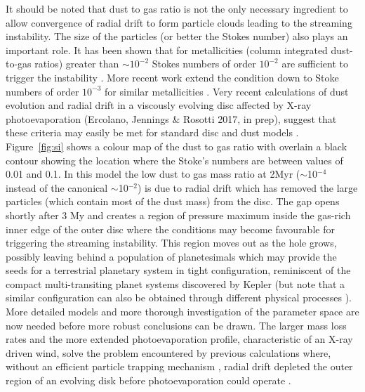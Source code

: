 \documentclass{rsos}
\begin{document}
It should be noted that dust to gas ratio is not the only necessary ingredient to allow  convergence of radial drift to form particle clouds leading to the streaming instability. The size of the particles (or better the Stokes number) also plays an important role. It has been shown that for metallicities (column integrated dust-to-gas ratios) greater than $\sim 10^{-2}$ Stokes numbers of order $10^{-2}$ are sufficient to trigger the instability  \cite{2014A&A...572A..78D}. More recent work  extend the condition down to Stoke numbers of order $10^{-3}$ for similar metallicities \cite{2015A&A...579A..43C}. 
Very recent calculations of dust evolution and radial drift in a viscously evolving disc affected by X-ray photoevaporation (Ercolano, Jennings \& Rosotti 2017, in prep), suggest that these criteria may easily be met for standard disc and dust models \cite{2010MNRAS.401.1415O, 2012A&A...539A.148B}. 
Figure~\ref{fig:si} shows a  colour map of the dust to gas ratio with overlain a black contour showing the location where the Stoke's numbers are between values of 0.01 and 0.1.
In this model the low dust to gas mass ratio at 2Myr ($\sim$10$^{-4}$ instead of the canonical $\sim$10$^{-2}$) is due to radial drift which has removed the large particles (which contain most of the dust mass) from the disc. The gap opens  shortly after 3 My and creates a region of pressure maximum inside the gas-rich inner edge of the outer disc where the conditions may become favourable for triggering the streaming instability. This region moves out as the hole grows, possibly leaving behind a population of planetesimals which may provide the seeds  for a terrestrial planetary system in tight configuration, reminiscent of the compact multi-transiting planet systems discovered by Kepler (but note that a similar configuration can also be obtained through  different physical processes \cite{2014ApJ...780...53C}). More detailed models and more thorough investigation of the parameter space are now needed before  more robust conclusions can be drawn. The larger mass loss rates and the more extended photoevaporation profile, characteristic of an X-ray driven wind, solve the problem encountered by previous calculations where, without 
an efficient particle trapping mechanism 
\cite{2012A&A...538A.114P}, radial drift depleted the outer region of an evolving disk before photoevaporation
could operate \cite{2005ApJ...627..286T, 2012MNRAS.423..389H}.
\end{document}
